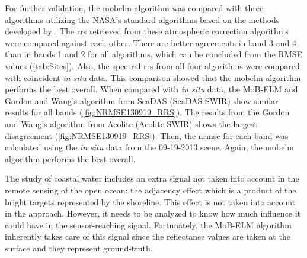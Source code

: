 
For further validation, the \gls{mobelm} algorithm was compared with three algorithms utilizing the NASA's standard algorithms based on the methods developed by \citet{Gordon:1994}. The \gls{rrs} retrieved from these atmospheric correction algorithms were compared against each other. There are better agreements in band 3 and 4 than in bands 1 and 2 for all algorithms, which can be concluded from the RMSE values (\autoref{tab:Sites}). Also, the spectral \gls{rrs} from all four algorithms were compared with coincident {\it in situ} data. This comparison showed that the \gls{mobelm} algorithm performs the best overall.  When compared with {\it in situ} data, the MoB-ELM and Gordon and Wang's algorithm from SeaDAS (SeaDAS-SWIR) show similar results for all bands (\autoref{fig:NRMSE130919_RRS}). The results from the Gordon and Wang's algorithm from Acolite (Acolite-SWIR) shows the largest disagreement (\autoref{fig:NRMSE130919_RRS}). Then, the \gls{nrmse} for each band was calculated using the {\it in situ} data from the 09-19-2013 scene. Again, the \gls{mobelm} algorithm performs the best overall.

The study of coastal water includes an extra signal not taken into account in the remote sensing of the open ocean: the adjacency effect which is a product of the bright targets represented by the shoreline. This effect is not taken into account in the \citet{Gordon:1994} approach. However, it needs to be analyzed to know how much influence it could have in the sensor-reaching signal. Fortunately, the MoB-ELM algorithm inherently takes care of this signal since the reflectance values are taken at the surface and they represent ground-truth.


